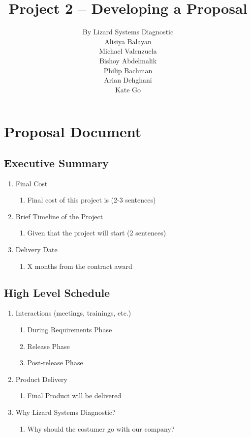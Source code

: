 \documentclass{article}
\title{Project 2 – Developing a Proposal}
\author{
By Lizard Systems Diagnostic\\
Alisiya Balayan\\
Michael Valenzuela\\
Bishoy Abdelmalik\\
Philip Bachman\\
Arian Dehghani\\
Kate Go
}
\begin{document}
\maketitle

\tableofcontents
\pagebreak

\section{Proposal Document}
\subsection{Executive Summary}
\begin{enumerate}
\item Final Cost
  \begin{enumerate}
  \item Final cost of this project is (2-3 sentences)
  \end{enumerate}
\item Brief Timeline of the Project
  \begin{enumerate}
  \item Given that the project will start (2 sentences)
  \end{enumerate}
\item Delivery Date
  \begin{enumerate}
  \item X months from the contract award
  \end{enumerate}
\end{enumerate}

\subsection{High Level Schedule}
\begin{enumerate}
\item Interactions (meetings, trainings, etc.)
  \begin{enumerate}
  \item During Requirements Phase
  \item Release Phase
  \item Post-release Phase
  \end{enumerate}
\item Product Delivery
  \begin{enumerate}
  \item Final Product will be delivered
  \end{enumerate}
\item Why Lizard Systems Diagnostic?
  \begin{enumerate}
  \item Why should the costumer go with our company?
  \end{enumerate}
\end{enumerate}
\end{document}
